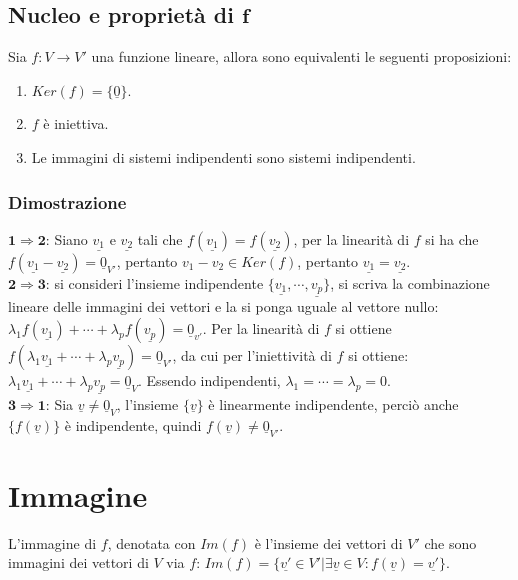 \subsection{Nucleo e propriet\`a di $\mathbf{f}$}
Sia $f:V\rightarrow V'$ una funzione lineare, allora sono equivalenti le seguenti proposizioni:
\begin{enumerate}
\item $Ker(f)=\{\underline{0}\}$.
\item $f$ \`e iniettiva.
\item Le immagini di sistemi indipendenti sono sistemi indipendenti.
\end{enumerate}
\subsubsection{Dimostrazione}
$\mathbf{1\Rightarrow 2}$: Siano $\underline{v_1}$ e $\underline{v_2}$ tali che $f(\underline{v_1})=f(\underline{v_2})$, per la linearit\`a di $f$ si ha che $f(\underline{v_1}-
\underline{v_2})=\underline{0}_{V'}$, pertanto $v_1-v_2\in Ker(f)$, pertanto $\underline{v_1}=\underline{v_2}$.\\
$\mathbf{2\Rightarrow 3}$: si consideri l'insieme indipendente $\{\underline{v_1},\cdots, \underline{v_p}\}$, si scriva la combinazione lineare delle immagini dei vettori e la si
ponga uguale al vettore nullo: $\lambda_1 f(\underline{v_1})+\cdots+\lambda_p f(\underline{v_p})=\underline{0}_{v'}$. Per la linearit\`a di $f$ si ottiene 
$f(\lambda_1\underline{v_1}+\cdots+\lambda_p\underline{v_p})=\underline{0}_{V'}$, da cui per l'iniettivit\`a di $f$ si ottiene: $\lambda_1\underline{v_1}+\cdots+\lambda_p
\underline{v_p}=\underline{0}_V$. Essendo indipendenti, $\lambda_1=\cdots=\lambda_p=0$.\\
$\mathbf{3\Rightarrow 1}$: Sia $\underline{v}\neq\underline{0}_V$, l'insieme $\{\underline{v}\}$ \`e linearmente indipendente, perci\`o anche $\{f(\underline{v})\}$ \`e 
indipendente, quindi $f(\underline{v})\neq\underline{0}_{V'}$.
\section{Immagine}
L'immagine di $f$, denotata con $Im(f)$ \`e l'insieme dei vettori di $V'$ che sono immagini dei vettori di $V$ via $f$: $Im(f)=\{\underline{v'}\in V'|\exists\underline{v}\in 
V:f(\underline{v})=\underline{v'}\}$.
